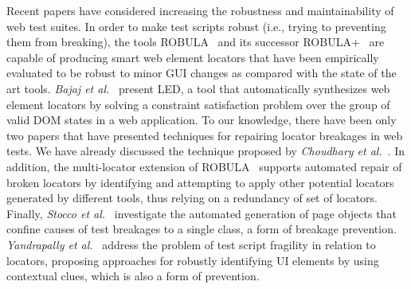  Recent papers have considered increasing the robustness and maintainability of web test suites. 
In order to make test scripts robust (i.e., trying to preventing them from breaking), the tools \textsc{ROBULA}~\cite{2014-leotta-WoSAR} and its successor \textsc{ROBULA+}~\cite{2016-Leotta-JSEP} are capable of producing smart web element locators that have been empirically evaluated to be robust to minor GUI changes as compared with the state of the art tools. \textit{Bajaj et al.}~\cite{kartik:ase15} present LED, a tool that automatically synthesizes web element locators by solving a constraint satisfaction problem over the group of valid DOM states in a web application. To our knowledge, there have been only two papers that have presented techniques for repairing locator breakages in web tests. We have already discussed the technique proposed by \textit{Choudhary et al.}~\cite{Choudhary:2011:WWA:2002931.2002935}. In addition, the multi-locator extension of ROBULA~\cite{2015-leotta-ICST} supports automated repair of broken locators by identifying and attempting to apply other potential locators generated by different tools, thus relying on a redundancy of set of locators. Finally, \textit{Stocco et al.}~\cite{2017-Stocco-SQJ,2016-Stocco-ICWE,2016-Stocco-ICWE-demo,2015-Stocco-AST} investigate the automated generation of page objects that confine causes of test breakages to a single class, a form of breakage prevention. \textit{Yandrapally et al.}~\cite{Yandrapally:2014:RTA:2610384.2610390} address the problem of test script fragility in relation to locators, proposing approaches for robustly identifying UI elements by using contextual clues, which is also a form of prevention.

